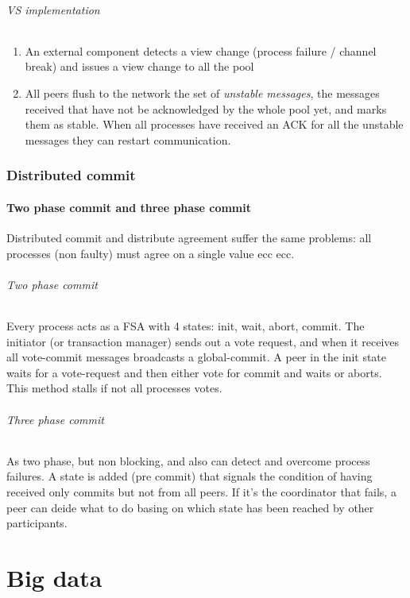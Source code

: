 \documentclass[10pt,a4paper]{article}
\begin{document}
				\paragraph{VS implementation}
					\begin{enumerate}
						\item An external component detects a view change (process failure / channel break) and issues a view change to all the pool
						\item All peers flush to the network the set of \emph{unstable messages}, the messages received that have not be acknowledged by the whole pool yet, and marks them as stable. When all processes have received an ACK for all the unstable messages they can restart communication. 
					\end{enumerate}
		
		\section{Distributed commit}
			\subsection{Two phase commit and three phase commit}
				Distributed commit and distribute agreement suffer the same problems: all processes (non faulty) must agree on a single value ecc ecc.
				\paragraph{Two phase commit}
					Every process acts as a FSA with 4 states: init, wait, abort, commit. The initiator (or transaction manager) sends out a vote request, and when it receives all vote-commit messages broadcasts a global-commit. A peer in the init state waits for a vote-request and then either vote for commit and waits or aborts.\\
					This method stalls if not all processes votes.
				\paragraph{Three phase commit}
					As two phase, but non blocking, and also can detect and overcome process failures. A state is added (pre commit) that signals the condition of having received only commits but not from all peers. If it's the coordinator that fails, a peer can deide what to do basing on which state has been reached by other participants. 
		
	\part{Big data}
\end{document}

